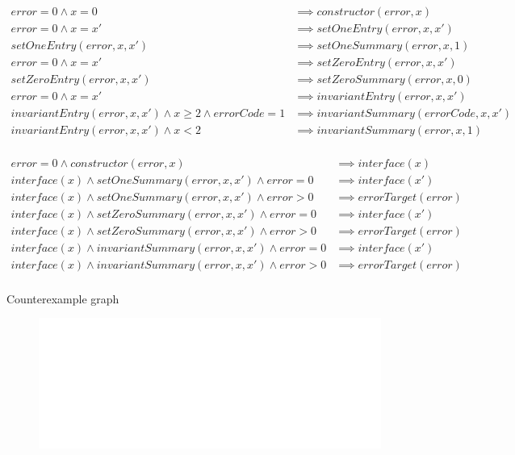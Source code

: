 \documentclass[aspectratio=169,10pt]{beamer}
\begin{document}
\begin{frame}[fragile]
{\small
\begin{align*}
error = 0 \land x = 0  & \implies constructor(error, x) \\
error = 0 \land x = x' & \implies setOneEntry(error, x, x') \\
setOneEntry(error, x, x') & \implies setOneSummary(error, x, 1) \\
error = 0 \land x = x' & \implies setZeroEntry(error, x, x') \\
setZeroEntry(error, x, x') & \implies setZeroSummary(error, x, 0) \\
error = 0 \land x = x' & \implies invariantEntry(error, x, x') \\
invariantEntry(error, x, x') \land x \ge 2 \land errorCode = 1 & \implies invariantSummary(errorCode, x, x') \\
invariantEntry(error, x, x') \land x < 2 & \implies invariantSummary(error, x, 1) \\
\end{align*}
}%
\end{frame}

\begin{frame}[fragile]
{\small
\begin{align*}
error = 0 \land	constructor(error, x) & \implies interface(x) \\
interface(x) \land setOneSummary(error, x, x') \land error = 0 & \implies interface(x') \\
interface(x) \land setOneSummary(error, x, x') \land error > 0 & \implies errorTarget(error) \\
interface(x) \land setZeroSummary(error, x, x') \land error = 0 & \implies interface(x') \\
interface(x) \land setZeroSummary(error, x, x') \land error > 0 & \implies errorTarget(error) \\
interface(x) \land invariantSummary(error, x, x') \land error = 0 & \implies interface(x') \\
interface(x) \land invariantSummary(error, x, x') \land error > 0 & \implies errorTarget(error) \\
\end{align*}
}%
\end{frame}

\begin{frame}[fragile]
\begin{center}
Counterexample graph
\begin{figure}
	\includegraphics[scale=0.4]{images/binary_machine_cex_graph}
\end{figure}
\end{center}
\end{frame}
\end{document}
